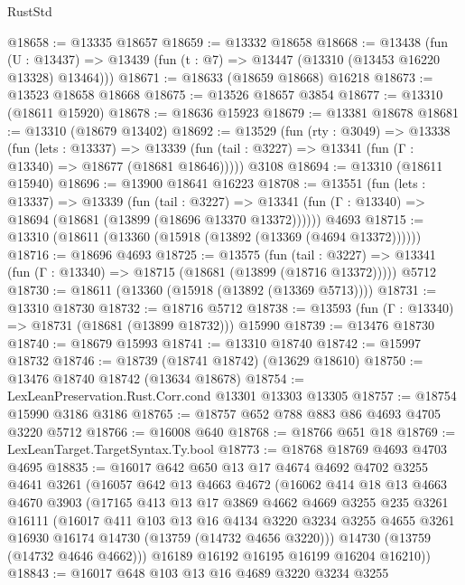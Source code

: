 \begin{lexlean}{RustStd}
\begin{coremodule}
@18658 := @13335 @18657
@18659 := @13332 @18658
@18668 := @13438
    (fun (U : @13437) => @13439 (fun (t : @7) => @13447 (@13310 (@13453 @16220 @13328) @13464)))
@18671 := @18633 (@18659 @18668) @16218
@18673 := @13523 @18658 @18668
@18675 := @13526 @18657 @3854
@18677 := @13310 (@18611 @15920)
@18678 := @18636 @15923
@18679 := @13381 @18678
@18681 := @13310 (@18679 @13402)
@18692 := @13529
    (fun (rty : @3049) =>
    @13338
      (fun (lets : @13337) =>
      @13339 (fun (tail : @3227) => @13341 (fun (Γ : @13340) => @18677 (@18681 @18646)))))
    @3108
@18694 := @13310 (@18611 @15940)
@18696 := @13900 @18641 @16223
@18708 := @13551
    (fun (lets : @13337) =>
    @13339
      (fun (tail : @3227) =>
      @13341 (fun (Γ : @13340) => @18694 (@18681 (@13899 (@18696 @13370 @13372))))))
    @4693
@18715 := @13310 (@18611 (@13360 (@15918 (@13892 (@13369 (@4694 @13372))))))
@18716 := @18696 @4693
@18725 := @13575
    (fun (tail : @3227) => @13341 (fun (Γ : @13340) => @18715 (@18681 (@13899 (@18716 @13372)))))
    @5712
@18730 := @18611 (@13360 (@15918 (@13892 (@13369 @5713))))
@18731 := @13310 @18730
@18732 := @18716 @5712
@18738 := @13593 (fun (Γ : @13340) => @18731 (@18681 (@13899 @18732))) @15990
@18739 := @13476 @18730
@18740 := @18679 @15993
@18741 := @13310 @18740
@18742 := @15997 @18732
@18746 := @18739 (@18741 @18742) (@13629 @18610)
@18750 := @13476 @18740 @18742 (@13634 @18678)
@18754 := LexLeanPreservation.Rust.Corr.cond @13301 @13303 @13305
@18757 := @18754 @15990 @3186 @3186
@18765 := @18757 @652 @788 @883 @86 @4693 @4705 @3220 @5712
@18766 := @16008 @640
@18768 := @18766 @651 @18
@18769 := LexLeanTarget.TargetSyntax.Ty.bool
@18773 := @18768 @18769 @4693 @4703 @4695
@18835 := @16017
    @642
    @650
    @13
    @17
    @4674
    @4692
    @4702
    @3255
    @4641
    @3261
    (@16057
      @642
      @13
      @4663
      @4672
      (@16062
        @414
        @18
        @13
        @4663
        @4670
        @3903
        (@17165
          @413
          @13
          @17
          @3869
          @4662
          @4669
          @3255
          @235
          @3261
          @16111
          (@16017
            @411
            @103
            @13
            @16
            @4134
            @3220
            @3234
            @3255
            @4655
            @3261
            @16930
            @16174
            @14730
            (@13759 (@14732 @4656 @3220)))
          @14730
          (@13759 (@14732 @4646 @4662)))
        @16189
        @16192
        @16195
        @16199
        @16204
        @16210))
@18843 := @16017 @648 @103 @13 @16 @4689 @3220 @3234 @3255

\end{coremodule}
\end{lexlean}
